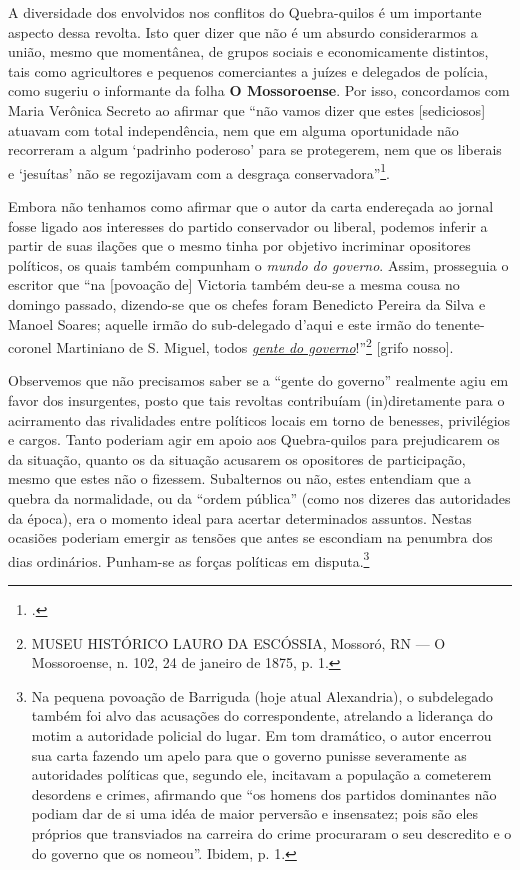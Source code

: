\begin{refsection}
A diversidade dos envolvidos nos conflitos do Quebra-quilos é um importante aspecto dessa revolta. Isto quer dizer que não é um absurdo considerarmos a união, mesmo que momentânea, de grupos sociais e economicamente distintos, tais como agricultores e pequenos comerciantes a juízes e delegados de polícia, como sugeriu o informante da folha \textbf{O Mossoroense}. Por isso, concordamos com Maria Verônica Secreto ao afirmar que “não vamos dizer que estes [sediciosos] atuavam com total independência, nem que em alguma oportunidade não recorreram a algum ‘padrinho poderoso’ para se protegerem, nem que os liberais e ‘jesuítas’ não se regozijavam com a desgraça conservadora”\footcite[p.~115]{secreto2011medidos}.

Embora não tenhamos como afirmar que o autor da carta endereçada ao jornal fosse ligado aos interesses do partido conservador ou liberal, podemos inferir a partir de suas ilações que o mesmo tinha por objetivo incriminar opositores políticos, os quais também compunham o \textit{mundo do governo}. Assim, prosseguia o escritor que “na [povoação de] Victoria também deu-se a mesma cousa no domingo passado, dizendo-se que os chefes foram Benedicto Pereira da Silva e Manoel Soares; aquelle irmão do sub-delegado d’aqui e este irmão do tenente-coronel Martiniano de S. Miguel, todos \underline{\textit{gente do governo}}!”\footnote{MUSEU HISTÓRICO LAURO DA ESCÓSSIA, Mossoró, RN --- O Mossoroense, n. 102, 24 de janeiro de 1875, p. 1.} [grifo nosso].

Observemos que não precisamos saber se a “gente do governo” realmente agiu em favor dos insurgentes, posto que tais revoltas contribuíam (in)diretamente para o acirramento das rivalidades entre políticos locais em torno de benesses, privilégios e cargos. Tanto poderiam agir em apoio aos Quebra-quilos para prejudicarem os da situação, quanto os da situação acusarem os opositores de participação, mesmo que estes não o fizessem. Subalternos ou não, estes entendiam que a quebra da normalidade, ou da “ordem pública” (como nos dizeres das autoridades da época), era o momento ideal para acertar determinados assuntos. Nestas ocasiões poderiam emergir as tensões que antes se escondiam na penumbra dos dias ordinários. Punham-se as forças políticas em disputa.\footnote{Na pequena povoação de Barriguda (hoje atual Alexandria), o subdelegado também foi alvo das acusações do correspondente, atrelando a liderança do motim a autoridade policial do lugar. Em tom dramático, o autor encerrou sua carta fazendo um apelo para que o governo punisse severamente as autoridades políticas que, segundo ele, incitavam a população a cometerem desordens e crimes, afirmando que “os homens dos partidos dominantes não podiam dar de si uma idéa de maior perversão e insensatez; pois são eles próprios que transviados na carreira do crime procuraram o seu descredito e o do governo que os nomeou”. Ibidem, p. 1.}


\end{refsection}
